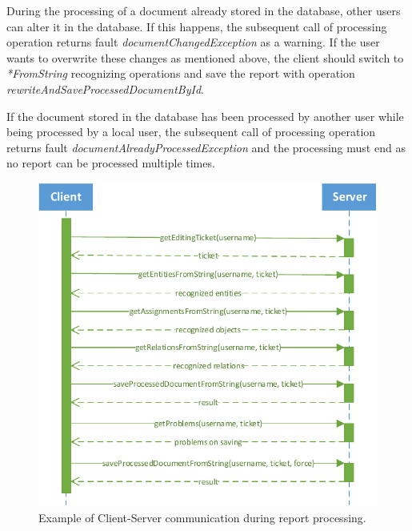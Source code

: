 During the processing of a document already stored in the database, other users
can alter it in the database. If this happens, the subsequent call of processing
operation returns fault \emph{documentChangedException} as a warning. If the
user wants to overwrite these changes as mentioned above, the client should
switch to \emph{*FromString} recognizing operations and save the report with
operation \emph{rewriteAndSaveProcessedDocumentById}.

If the document stored in the database has been processed by another user while
being processed by a local user, the subsequent call of processing operation
returns fault \emph{documentAlreadyProcessedException} and the processing must
end as no report can be processed multiple times.

\begin{figure}[!htb]
        \centering
        \includegraphics{Images/ClientServerCommunication}
        \caption{Example of Client-Server communication during report processing.}
        \label{fig:ClientServerCommunication}
\end{figure}
